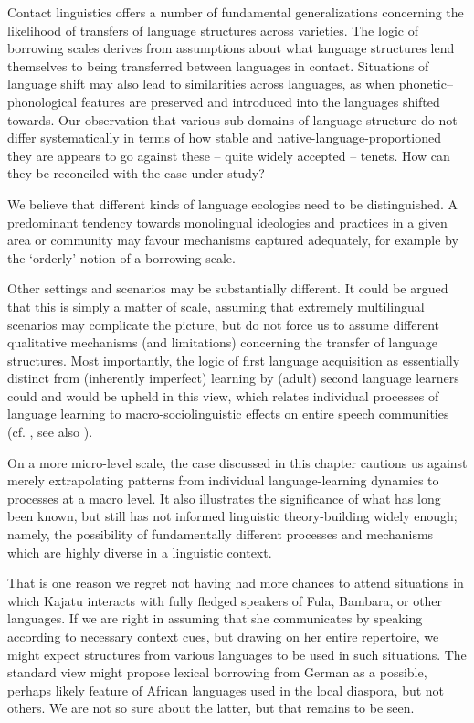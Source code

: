\documentclass[output=paper]{langscibook}
\begin{document}
Contact linguistics offers a number of fundamental generalizations concerning the likelihood of transfers of language structures across varieties. The logic of borrowing scales derives from assumptions about what language structures lend themselves to being transferred between languages in contact. Situations of language shift may also lead to similarities across languages, as when phonetic–phonological features are preserved and introduced into the languages shifted towards. Our observation that various sub-domains of language structure do not differ systematically in terms of how stable and native-language-proportioned they are appears to go against these – quite widely accepted – tenets. How can they be reconciled with the case under study?

We believe that different kinds of language ecologies need to be distinguished. A predominant tendency towards monolingual ideologies and practices in a given area or community may favour mechanisms captured adequately, for example by the ‘orderly’ notion of a borrowing scale. 


Other settings and scenarios may be substantially different. It could be argued that this is simply a matter of scale, assuming that extremely multilingual scenarios may complicate the picture, but do not force us to assume different qualitative mechanisms (and limitations) concerning the transfer of language structures. Most importantly, the logic of first language acquisition as essentially distinct from (inherently imperfect) learning by (adult) second language learners could and would be upheld in this view, which relates individual processes of language learning to macro-sociolinguistic effects on entire speech communities (cf. \citealt{thomason_language_1988}, see also \citealt{trudgill_sociolinguistic_2011}). 

On a more micro-level scale, the case discussed in this chapter cautions us against merely extrapolating patterns from individual language-learning dynamics to processes at a macro level. It also illustrates the significance of what has long been known, but still has not informed linguistic theory-building widely enough; namely, the possibility of fundamentally different processes and mechanisms which are highly diverse in a linguistic context.

That is one reason we regret not having had more chances to attend situations in which Kajatu interacts with fully fledged speakers of Fula, Bambara, or other languages. If we are right in assuming that she communicates by speaking according to necessary context cues, but drawing on her entire repertoire, we might expect structures from various languages to be used in such situations. The standard view might propose lexical borrowing from German as a possible, perhaps likely feature of African languages used in the local diaspora, but not others. We are not so sure about the latter, but that remains to be seen.
\end{document}
